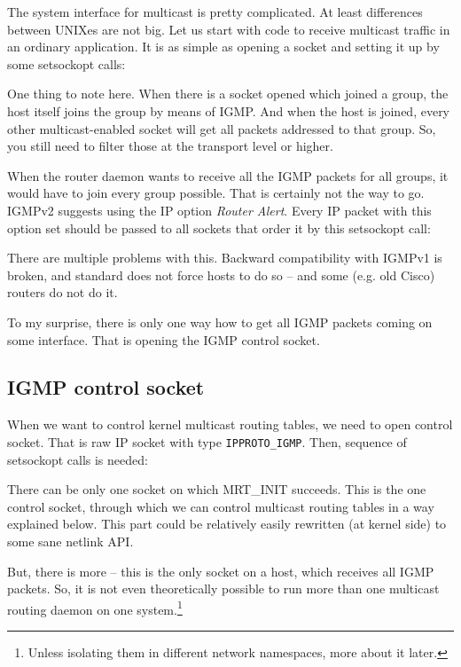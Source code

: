The system interface for multicast is pretty complicated. At least differences
between UNIXes are not big. Let us start with code to receive multicast traffic
in an ordinary application. It is as simple as opening a socket and setting it
up by some setsockopt calls:


\noindent One thing to note here. When there is a socket opened which joined a group, the host itself joins the group by means of IGMP. And when the host is
joined, every other multicast-enabled socket will get all packets addressed to that
group. So, you still need to filter those at the transport level or higher.

When the router daemon wants to receive all the IGMP packets for all groups, it
would have to join every group possible. That is certainly not the way to go.
IGMPv2 suggests using the IP option \emph{Router Alert}. Every IP packet with this option
set should be passed to all sockets that order it by this setsockopt call:


\noindent There are multiple problems with this. Backward compatibility with
IGMPv1 is broken, and standard does not force hosts to do so -- and some (e.g.
old Cisco) routers do not do it.

To my surprise, there is only one way how to get all IGMP packets coming on
some interface. That is opening the IGMP control socket.

\subsection{IGMP control socket}

When we want to control kernel multicast routing tables, we need to open
control socket. That is raw IP socket with type \texttt{IPPROTO\_IGMP}. Then,
sequence of setsockopt calls is needed:


There can be only one socket on which MRT\_INIT succeeds. This is the one
control socket, through which we can control multicast routing tables in a way
explained below. This part could be relatively easily rewritten (at kernel
side) to some sane netlink API.

But, there is more -- this is the only socket on a host, which receives all
IGMP packets. So, it is not even theoretically possible to run more than one
multicast routing daemon on one system.\footnote{Unless isolating them in
different network namespaces, more about it later.}
